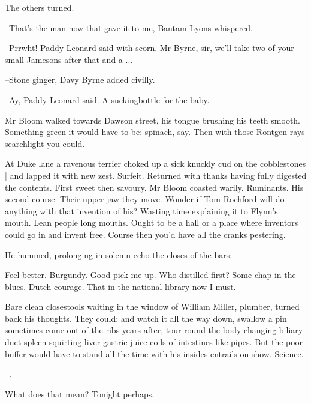 The others turned.

--That's the man now that gave it to me,
Bantam Lyons whispered.

--Prrwht!
Paddy Leonard said with scorn.
Mr Byrne, sir,
we'll take two of your small Jamesons after that and a ...

--Stone ginger,
Davy Byrne added civilly.

--Ay,
Paddy Leonard said.
A suckingbottle for the baby.

Mr Bloom walked towards Dawson street,
his tongue brushing his teeth smooth.
Something green it would have to be:
spinach, say.
Then with those Rontgen rays searchlight
you could.

At Duke lane
a ravenous terrier choked up a sick knuckly cud on the cobblestones |
and lapped it with new zest.
Surfeit.
Returned with thanks having fully digested the contents.
First sweet then savoury.
Mr Bloom coasted warily.
Ruminants.
His second course.
Their upper jaw they move.
Wonder if Tom Rochford will do anything with that invention of his?
Wasting time explaining it to Flynn's mouth.
Lean people long mouths.
Ought to be a hall or a place where inventors could go in and invent free.
Course then you'd have all the cranks pestering.

He hummed,
prolonging in solemn echo the closes of the bars:



Feel better.
Burgundy.
Good pick me up.
Who distilled first?
Some chap in the blues.
Dutch courage.
That  in the national library now I must.

Bare clean closestools waiting in the window of William Miller, plumber,
turned back his thoughts.
They could:
and watch it all the way down,
swallow a pin sometimes come out of the ribs years after,
tour round the body changing biliary duct spleen
squirting liver gastric juice
coils of intestines like pipes.
But the poor buffer would have to stand
all the time with his insides entrails on show.
Science.

--.

What does that  mean?
Tonight perhaps.


